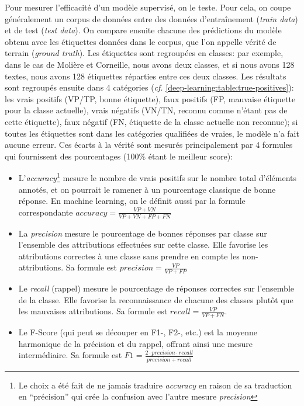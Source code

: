 Pour mesurer l'efficacité d'un modèle supervisé, on le teste. Pour cela, on coupe généralement un corpus de données entre des données d'entraînement (\textit{train data}) et de test (\textit{test data}). On compare ensuite chacune des prédictions du modèle obtenu avec les étiquettes données dans le corpus, que l'on appelle vérité de terrain (\textit{ground truth}). Les étiquettes sont regroupées en classes: par exemple, dans le cas de Molière et Corneille, nous avons deux classes, et si nous avons 128 textes, nous avons 128 étiquettes réparties entre ces deux classes. Les résultats sont regroupés ensuite dans 4 catégories (\textit{cf.} \ref{deep-learning:table:true-positives}): les vrais positifs (VP/TP, bonne étiquette), faux positifs (FP, mauvaise étiquette pour la classe actuelle), vrais négatifs (VN/TN, reconnu comme n'étant pas de cette étiquette), faux négatif (FN, étiquette de la classe actuelle non reconnue); si toutes les étiquettes sont dans les catégories qualifiées de vraies, le modèle n'a fait aucune erreur. Ces écarts à la vérité sont mesurés principalement par 4 formules qui fournissent des pourcentages (100\% étant le meilleur score):
\begin{itemize}
    \item L'\textit{accuracy}\footnote{Le choix a été fait de ne jamais traduire \textit{accuracy} en raison de sa traduction en \enquote{précision} qui crée la confusion avec l'autre mesure \textit{precision}} mesure le nombre de vrais positifs sur le nombre total d'éléments annotés, et on pourrait le ramener à un pourcentage classique de bonne réponse. En machine learning, on le définit aussi par la formule correspondante $accuracy = \frac{VP + VN}{VP + VN + FP + FN}$
    \item La \textit{precision} mesure le pourcentage de bonnes réponses par classe sur l'ensemble des attributions effectuées sur cette classe. Elle favorise les attributions correctes à une classe sans prendre en compte les non-attributions. Sa formule est $precision = \frac{VP}{VP + FP}$
    \item Le \textit{recall} (rappel) mesure le pourcentage de réponses correctes sur l'ensemble de la classe. Elle favorise la reconnaissance de chacune des classes plutôt que les mauvaises attributions. Sa formule est $recall = \frac{VP}{VP+FN}$.
    \item Le F-Score (qui peut se découper en F1-, F2-, etc.) est la moyenne harmonique de la précision et du rappel, offrant ainsi une mesure intermédiaire. Sa formule est $F1 = \frac{2 \cdot precision\cdot recall}{precision+ recall}$
\end{itemize}{}

